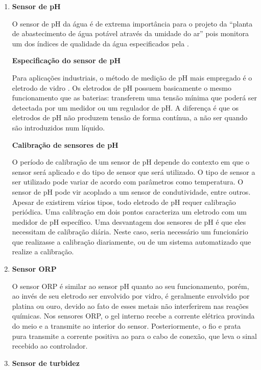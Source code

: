 \begin{enumerate}
    \item \textbf{Sensor de pH}
    
	O sensor de pH da água é de extrema importância para o projeto da “planta de abastecimento de água potável
	através da umidade do ar” pois monitora um dos índices de qualidade da água especificados pela \cite{anaGov}.
	
	\begin{center}
	 \textbf{Especificação do sensor de pH}
	\end{center}

	Para aplicações industriais, o método de medição de pH mais empregado é o eletrodo de vidro \cite{sole79}.
	Os eletrodos de pH possuem basicamente o mesmo funcionamento que as baterias: transferem uma tensão mínima que poderá
	ser detectada por um medidor ou um regulador de pH. A diferença é que os eletrodos de pH não produzem tensão de forma
	contínua, a não ser quando são introduzidos num líquido.
	
	\begin{center}
	 \textbf{Calibração de sensores de pH}
	\end{center}
	
	O período de calibração de um sensor de pH depende do contexto em que o sensor será aplicado e do tipo de sensor
	que será utilizado. O tipo de sensor a ser utilizado pode variar de acordo com parâmetros como temperatura.
	O sensor de pH pode vir acoplado a um sensor de condutividade, entre outros. Apesar de existirem vários tipos,
	todo eletrodo de pH requer calibração periódica. Uma calibração em dois pontos caracteriza um eletrodo com um
	medidor de pH específico. Uma desvantagem dos sensores de pH é que eles necessitam de calibração diária.
	Neste caso, seria necessário um funcionário que realizasse a calibração diariamente, ou de um sistema automatizado
	que realize a calibração.
	
	
    \item \textbf{Sensor ORP}
    
	O sensor ORP é similar ao sensor pH quanto ao seu funcionamento, porém, ao invés de seu eletrodo ser envolvido por
	vidro, é geralmente envolvido por platina ou ouro, devido ao fato de esses metais não interferirem nas reações químicas.
	Nos sensores ORP, o gel interno recebe a corrente elétrica provinda do meio e a transmite ao interior do sensor.
	Posteriormente, o fio e prata pura transmite a corrente positiva ao para o cabo de conexão, que leva o sinal recebido
	ao controlador.
	
    \item \textbf{Sensor de turbidez}
    

\end{enumerate}
